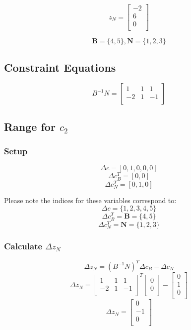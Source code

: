 \documentclass[14pt]{extarticle}
\begin{document}
\[
    z_N = \begin{bmatrix}
        -2 \\
        6 \\
        0 \\
    \end{bmatrix}
\]

\[
    \boldsymbol{B} = \{4, 5\}, \boldsymbol{N} = \{1, 2, 3\}
\]

\subsection*{Constraint Equations}
\[
    B^{-1}N = \begin{bmatrix}
        1 & 1 & 1 \\
        -2 & 1 & -1 \\
    \end{bmatrix}
\]

\subsection*{Range for $c_2$}
\subsubsection*{Setup}
\[
    \Delta c = [0, 1, 0, 0, 0]
\]
\[
    \Delta c^T_B = [0, 0]
\]
\[
    \Delta c^T_N = [0, 1, 0]
\]

\bigskip Please note the indices for these variables correspond to:
\[
    \Delta c = \{1, 2, 3, 4, 5\}
\]
\[
    \Delta c^T_B = \boldsymbol{B} = \{4, 5\}
\]
\[
    \Delta c^T_N = \boldsymbol{N} = \{1, 2, 3\}
\]

\subsubsection*{Calculate $\Delta z_N$}
\[
    \Delta z_N = (B^{-1}N)^T \Delta c_B - \Delta c_N
\]
\[
    \Delta z_N = \begin{bmatrix}
        1 & 1 & 1 \\
        -2 & 1 & -1 \\
    \end{bmatrix}^T
    \begin{bmatrix}
        0 \\
        0 \\
    \end{bmatrix}
    - \begin{bmatrix}
        0 \\
        1 \\
        0 \\
    \end{bmatrix}
\]
\[
    \Delta z_N = \begin{bmatrix}
        0 \\
        -1 \\
        0 \\
    \end{bmatrix}
\]
\end{document}
